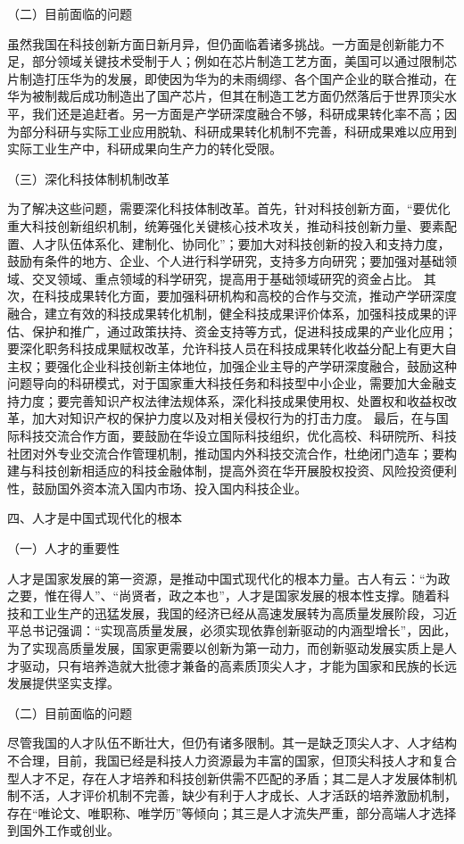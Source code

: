 \documentclass{article} %
\begin{document}
\begin{CJK*}{UTF8}{gbsn}
（二）目前面临的问题

虽然我国在科技创新方面日新月异，但仍面临着诸多挑战。一方面是创新能力不足，部分领域关键技术受制于人；例如在芯片制造工艺方面，美国可以通过限制芯片制造打压华为的发展，即使因为华为的未雨绸缪、各个国产企业的联合推动，在华为被制裁后成功制造出了国产芯片，但其在制造工艺方面仍然落后于世界顶尖水平，我们还是追赶者。另一方面是产学研深度融合不够，科研成果转化率不高；因为部分科研与实际工业应用脱轨、科研成果转化机制不完善，科研成果难以应用到实际工业生产中，科研成果向生产力的转化受限。

（三）深化科技体制机制改革

为了解决这些问题，需要深化科技体制改革。首先，针对科技创新方面，“要优化重大科技创新组织机制，统筹强化关键核心技术攻关，推动科技创新力量、要素配置、人才队伍体系化、建制化、协同化”；要加大对科技创新的投入和支持力度，鼓励有条件的地方、企业、个人进行科学研究，支持多方向研究；要加强对基础领域、交叉领域、重点领域的科学研究，提高用于基础领域研究的资金占比。
其次，在科技成果转化方面，要加强科研机构和高校的合作与交流，推动产学研深度融合，建立有效的科技成果转化机制，健全科技成果评价体系，加强科技成果的评估、保护和推广，通过政策扶持、资金支持等方式，促进科技成果的产业化应用；要深化职务科技成果赋权改革，允许科技人员在科技成果转化收益分配上有更大自主权；要强化企业科技创新主体地位，加强企业主导的产学研深度融合，鼓励这种问题导向的科研模式，对于国家重大科技任务和科技型中小企业，需要加大金融支持力度；要完善知识产权法律法规体系，深化科技成果使用权、处置权和收益权改革，加大对知识产权的保护力度以及对相关侵权行为的打击力度。
最后，在与国际科技交流合作方面，要鼓励在华设立国际科技组织，优化高校、科研院所、科技社团对外专业交流合作管理机制，推动国内外科技交流合作，杜绝闭门造车；要构建与科技创新相适应的科技金融体制，提高外资在华开展股权投资、风险投资便利性，鼓励国外资本流入国内市场、投入国内科技企业。

四、人才是中国式现代化的根本

（一）人才的重要性

人才是国家发展的第一资源，是推动中国式现代化的根本力量。古人有云：“为政之要，惟在得人”、“尚贤者，政之本也”，人才是国家发展的根本性支撑。随着科技和工业生产的迅猛发展，我国的经济已经从高速发展转为高质量发展阶段，习近平总书记强调：“实现高质量发展，必须实现依靠创新驱动的内涵型增长”，因此，为了实现高质量发展，国家更需要以创新为第一动力，而创新驱动发展实质上是人才驱动，只有培养造就大批德才兼备的高素质顶尖人才，才能为国家和民族的长远发展提供坚实支撑。

（二）目前面临的问题

尽管我国的人才队伍不断壮大，但仍有诸多限制。其一是缺乏顶尖人才、人才结构不合理，目前，我国已经是科技人力资源最为丰富的国家，但顶尖科技人才和复合型人才不足，存在人才培养和科技创新供需不匹配的矛盾；其二是人才发展体制机制不活，人才评价机制不完善，缺少有利于人才成长、人才活跃的培养激励机制，存在“唯论文、唯职称、唯学历”等倾向；其三是人才流失严重，部分高端人才选择到国外工作或创业。


\end{CJK*}
\end{document}
